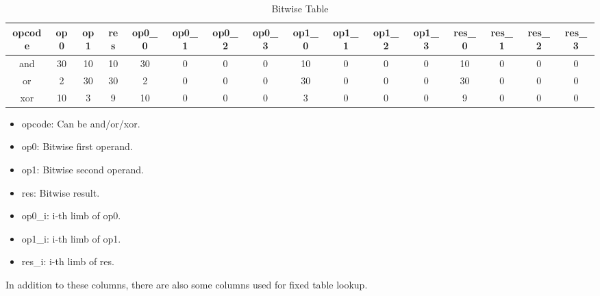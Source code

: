  \label{sec:bitwise-table}
\begin{table}[!ht]
    \centering
    \begin{adjustwidth}{-1cm}{}
        \begin{tabular}{|c|c|c|c|c|c|c|c|c|c|c|c|c|c|c|c|}
            \hline
            \rowcolor{gray} opcode & op0 & op1 & res & op0\_0 & op0\_1 & op0\_2 & op0\_3 & op1\_0 & op1\_1 & op1\_2 & op1\_3 & res\_0 & res\_1 & res\_2 & res\_3 \\
            \hline
            and                    & 30  & 10  & 10  & 30     & 0      & 0      & 0      & 10     & 0      & 0      & 0      & 10     & 0      & 0      & 0      \\
            \hline
            or                     & 2   & 30  & 30  & 2      & 0      & 0      & 0      & 30     & 0      & 0      & 0      & 30     & 0      & 0      & 0      \\
            \hline
            xor                    & 10  & 3   & 9   & 10     & 0      & 0      & 0      & 3      & 0      & 0      & 0      & 9      & 0      & 0      & 0      \\
            \hline
        \end{tabular}
    \end{adjustwidth}
    \caption{Bitwise Table}
    \label{table:bitwise-table}
\end{table}
\begin{itemize}
    \item opcode: Can be and/or/xor.
    \item op0: Bitwise first operand.
    \item op1: Bitwise second operand.
    \item res: Bitwise result.
    \item op0\_i: i-th limb of op0.
    \item op1\_i: i-th limb of op1.
    \item res\_i: i-th limb of res.
\end{itemize}
In addition to these columns, there are also some columns used for fixed table lookup.